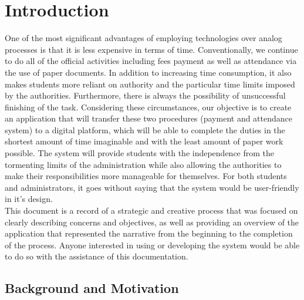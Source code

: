 
\section{Introduction}\label{sec:introduction}
One of the most significant advantages of employing technologies over analog processes is that it is less expensive in terms of time. Conventionally, we continue to do all of the official activities including fees payment as well as attendance via the use of paper documents. In addition to increasing time consumption, it also makes students more reliant on authority and the particular time limits imposed by the authorities. Furthermore, there is always the possibility of unsuccessful finishing of the task. Considering these circumstances, our objective is to create an application that will transfer these two procedures (payment and attendance system) to a digital platform, which will be able to complete the duties in the shortest amount of time imaginable and with the least amount of paper work possible. The system will provide students with the independence from the tormenting limits of the administration while also allowing the authorities to make their responsibilities more manageable for themselves. For both students and administrators, it goes without saying that the system would be user-friendly in it's design.\\

This document is a record of a strategic and creative process that was focused on clearly describing concerns and objectives, as well as providing an overview of the application that represented the narrative from the beginning to the completion of the process. Anyone interested in using or developing the system would be able to do so with the assistance of this documentation.


\clearpage


\subsection{Background and Motivation}\label{subsec:bm}

